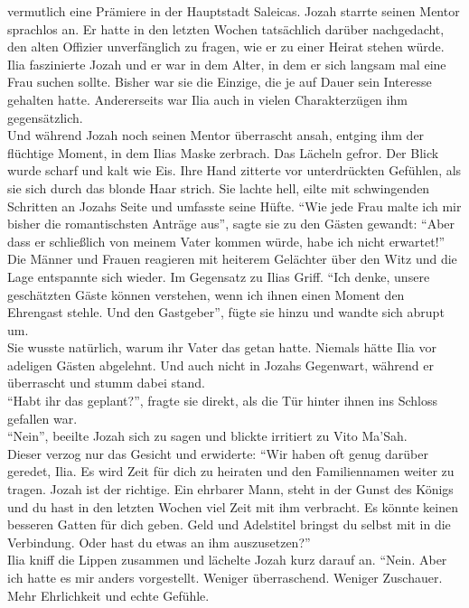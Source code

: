 vermutlich eine Prämiere in der Hauptstadt Saleicas. Jozah starrte seinen Mentor sprachlos an. Er 
hatte in den letzten Wochen tatsächlich darüber nachgedacht, den alten Offizier unverfänglich zu 
fragen, wie er zu einer Heirat stehen würde. Ilia faszinierte Jozah und er war in dem Alter, in dem 
er sich langsam mal eine Frau suchen sollte. Bisher war sie die Einzige, die je auf Dauer sein 
Interesse gehalten hatte. Andererseits war Ilia auch in vielen Charakterzügen ihm gegensätzlich.\\
Und während Jozah noch seinen Mentor überrascht ansah, entging ihm der flüchtige Moment, in dem 
Ilias Maske zerbrach. Das Lächeln gefror. Der Blick wurde scharf und kalt wie Eis. Ihre Hand 
zitterte vor unterdrückten Gefühlen, als sie sich durch das blonde Haar strich. Sie lachte hell, 
eilte mit schwingenden Schritten an Jozahs Seite und umfasste seine Hüfte. ``Wie jede Frau malte 
ich mir bisher die romantischsten Anträge aus'', sagte sie zu den Gästen gewandt: ``Aber dass er 
schließlich von meinem Vater kommen würde, habe ich nicht erwartet!''\\
Die Männer und Frauen reagieren mit heiterem Gelächter über den Witz und die Lage entspannte sich 
wieder. Im Gegensatz zu Ilias Griff. ``Ich denke, unsere geschätzten Gäste können verstehen, wenn 
ich ihnen einen Moment den Ehrengast stehle. Und den Gastgeber'', fügte sie hinzu und wandte sich 
abrupt um.\\
Sie wusste natürlich, warum ihr Vater das getan hatte. Niemals hätte Ilia vor adeligen Gästen 
abgelehnt. Und auch nicht in Jozahs Gegenwart, während er überrascht und stumm dabei stand.\\
``Habt ihr das geplant?'', fragte sie direkt, als die Tür hinter ihnen ins Schloss gefallen war.\\
``Nein'', beeilte Jozah sich zu sagen und blickte irritiert zu Vito Ma'Sah.\\
Dieser verzog nur das Gesicht und erwiderte: ``Wir haben oft genug darüber geredet, Ilia. Es wird 
Zeit für dich zu heiraten und den Familiennamen weiter zu tragen. Jozah ist der richtige. Ein 
ehrbarer Mann, steht in der Gunst des Königs und du hast in den letzten Wochen viel Zeit mit ihm 
verbracht. Es könnte keinen besseren Gatten für dich geben. Geld und Adelstitel bringst du selbst 
mit in die Verbindung. Oder hast du etwas an ihm auszusetzen?''\\
Ilia kniff die Lippen zusammen und lächelte Jozah kurz darauf an. ``Nein. Aber ich hatte es mir 
anders vorgestellt. Weniger überraschend. Weniger Zuschauer. Mehr Ehrlichkeit und echte Gefühle. 
